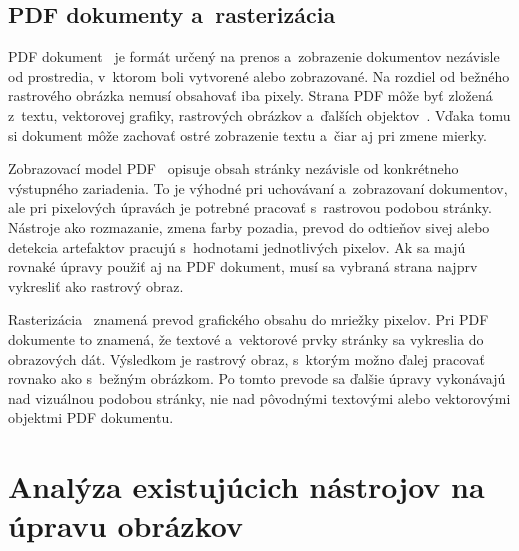 \section{PDF dokumenty a~rasterizácia}
\label{sec:pdf_rasterization}

PDF dokument~\cite{pdfreference} je formát určený na prenos a~zobrazenie dokumentov nezávisle od prostredia, v~ktorom boli vytvorené alebo zobrazované. Na rozdiel od bežného rastrového obrázka nemusí obsahovať iba pixely. Strana PDF môže byť zložená z~textu, vektorovej grafiky, rastrových obrázkov a~ďalších objektov~\cite{whitington}. Vďaka tomu si dokument môže zachovať ostré zobrazenie textu a~čiar aj pri zmene mierky.

Zobrazovací model PDF~\cite{pdfreference} opisuje obsah stránky nezávisle od konkrétneho výstupného zariadenia. To je výhodné pri uchovávaní a~zobrazovaní dokumentov, ale pri pixelových úpravách je potrebné pracovať s~rastrovou podobou stránky. Nástroje ako rozmazanie, zmena farby pozadia, prevod do odtieňov sivej alebo detekcia artefaktov pracujú s~hodnotami jednotlivých pixelov. Ak sa majú rovnaké úpravy použiť aj na PDF dokument, musí sa vybraná strana najprv vykresliť ako rastrový obraz.

Rasterizácia~\cite{rasterizationlecture} znamená prevod grafického obsahu do mriežky pixelov. Pri PDF dokumente to znamená, že textové a~vektorové prvky stránky sa vykreslia do obrazových dát. Výsledkom je rastrový obraz, s~ktorým možno ďalej pracovať rovnako ako s~bežným obrázkom. Po tomto prevode sa ďalšie úpravy vykonávajú nad vizuálnou podobou stránky, nie nad pôvodnými textovými alebo vektorovými objektmi PDF dokumentu.

\chapter{Analýza existujúcich nástrojov na úpravu obrázkov}
\label{chap_analyza}

